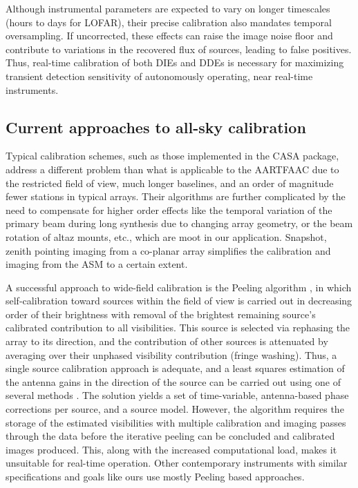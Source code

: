 \documentclass[referee]{aa}
\begin{document}
Although  instrumental parameters  are  expected to  vary  on longer  timescales
(hours  to days  for LOFAR),  their precise  calibration also  mandates temporal
oversampling.  If uncorrected, these effects can raise the image noise floor and
contribute  to variations in  the recovered  flux of  sources, leading  to false
positives.  Thus, real-time  calibration of both DIEs and  DDEs is necessary for
maximizing  transient  detection  sensitivity  of autonomously  operating,  near
real-time instruments.

\subsection{Current approaches to all-sky calibration}

Typical  calibration schemes,  such as  those implemented  in the  CASA package,
address a different  problem than what is applicable to the  AARTFAAC due to the
restricted field of view, much longer baselines, and an order of magnitude fewer
stations in  typical arrays.   Their algorithms are  further complicated  by the
need to compensate  for higher order effects like the  temporal variation of the
primary beam during  long synthesis due to changing array  geometry, or the beam
rotation of  altaz mounts, etc., which  are moot in  our application.  Snapshot,
zenith pointing  imaging from a  co-planar array simplifies the  calibration and
imaging from the ASM to a certain extent.

A  successful  approach  to  wide-field  calibration  is  the  Peeling  algorithm
\citep{noordam2004peel,vdTol2007selfcallofar}, in which self-calibration toward
sources within  the field of  view is carried  out in decreasing order  of their
brightness  with  removal  of   the  brightest  remaining  source's  calibrated
contribution  to all  visibilities. This  source is  selected via  rephasing the
array to its  direction, and the contribution of other  sources is attenuated by
averaging over their unphased  visibility contribution (fringe washing). Thus, a
single source calibration  approach is adequate, and a  least squares estimation
of the antenna gains in the direction of the source can be carried out using one
of  several methods  \citep{boonstra2003gain}.   The solution  yields  a set  of
time-variable, antenna-based  phase corrections per source, and  a source model.
However, the algorithm requires the  storage of the estimated visibilities with
multiple calibration  and imaging passes  through the data before  the iterative
peeling can be  concluded and calibrated images produced.  This, along with the
increased computational load, makes it unsuitable for real-time operation.  Other
contemporary  instruments with  similar  specifications and  goals  like ours  use
mostly Peeling  based approaches. 
\end{document}
